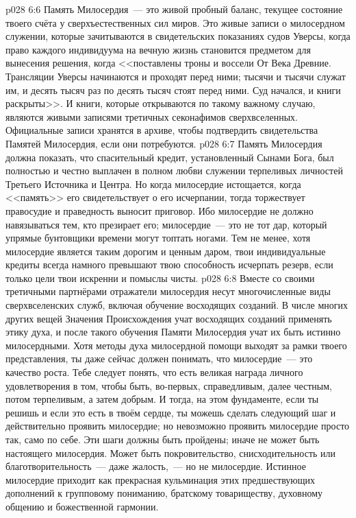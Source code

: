 \vs p028 6:6 Память Милосердия~--- это живой пробный баланс, текущее состояние твоего счёта у сверхъестественных сил миров. Это живые записи о милосердном служении, которые зачитываются в свидетельских показаниях судов Уверсы, когда право каждого индивидуума на вечную жизнь становится предметом для вынесения решения, когда <<поставлены троны и воссели От Века Древние. Трансляции Уверсы начинаются и проходят перед ними; тысячи и тысячи служат им, и десять тысяч раз по десять тысяч стоят перед ними. Суд начался, и книги раскрыты>>. И книги, которые открываются по такому важному случаю, являются живыми записями третичных секонафимов сверхвселенных. Официальные записи хранятся в архиве, чтобы подтвердить свидетельства Памятей Милосердия, если они потребуются.
\vs p028 6:7 Память Милосердия должна показать, что спасительный кредит, установленный Сынами Бога, был полностью и честно выплачен в полном любви служении терпеливых личностей Третьего Источника и Центра. Но когда милосердие истощается, когда <<память>> его свидетельствует о его исчерпании, тогда торжествует правосудие и праведность выносит приговор. Ибо милосердие не должно навязываться тем, кто презирает его; милосердие~--- это не тот дар, который упрямые бунтовщики времени могут топтать ногами. Тем не менее, хотя милосердие является таким дорогим и ценным даром, твои индивидуальные кредиты всегда намного превышают твою способность исчерпать резерв, если только цели твои искренни и помыслы чисты.
\vs p028 6:8 \pc Вместе со своими третичными партнёрами отражатели милосердия несут многочисленные виды сверхвселенских служб, включая обучение восходящих созданий. В числе многих других вещей Значения Происхождения учат восходящих созданий применять этику духа, и после такого обучения Памяти Милосердия учат их быть истинно милосердными. Хотя методы духа милосердной помощи выходят за рамки твоего представления, ты даже сейчас должен понимать, что милосердие~--- это качество роста. Тебе следует понять, что есть великая награда личного удовлетворения в том, чтобы быть, во\hyp{}первых, справедливым, далее честным, потом терпеливым, а затем добрым. И тогда, на этом фундаменте, если ты решишь и если это есть в твоём сердце, ты можешь сделать следующий шаг и действительно проявить милосердие; но невозможно проявить милосердие просто так, само по себе. Эти шаги должны быть пройдены; иначе не может быть настоящего милосердия. Может быть покровительство, снисходительность или благотворительность~--- даже жалость,~--- но не милосердие. Истинное милосердие приходит как прекрасная кульминация этих предшествующих дополнений к групповому пониманию, братскому товариществу, духовному общению и божественной гармонии.
